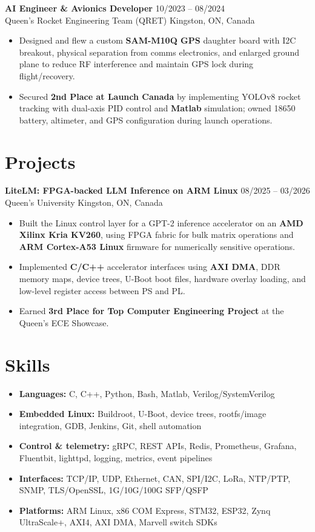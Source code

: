 \documentclass[letterpaper,10pt]{article}
\begin{document}
    \noindent \textbf{AI Engineer \& Avionics Developer} \hfill 10/2023 -- 08/2024 \\
    Queen's Rocket Engineering Team (QRET) \hfill Kingston, ON, Canada
    \begin{itemize}
        \item Designed and flew a custom \textbf{SAM-M10Q GPS} daughter board with I2C breakout, physical separation from comms electronics, and enlarged ground plane to reduce RF interference and maintain GPS lock during flight/recovery.
        \item Secured \textbf{2nd Place at Launch Canada} by implementing YOLOv8 rocket tracking with dual-axis PID control and \textbf{Matlab} simulation; owned 18650 battery, altimeter, and GPS configuration during launch operations.
    \end{itemize}

    \section{Projects}
    \noindent \textbf{LiteLM: FPGA-backed LLM Inference on ARM Linux} \hfill 08/2025 -- 03/2026 \\
    Queen's University \hfill Kingston, ON, Canada
    \begin{itemize}
        \item Built the Linux control layer for a GPT-2 inference accelerator on an \textbf{AMD Xilinx Kria KV260}, using FPGA fabric for bulk matrix operations and \textbf{ARM Cortex-A53 Linux} firmware for numerically sensitive operations.
        \item Implemented \textbf{C/C++} accelerator interfaces using \textbf{AXI DMA}, DDR memory maps, device trees, U-Boot boot files, hardware overlay loading, and low-level register access between PS and PL.
        \item Earned \textbf{3rd Place for Top Computer Engineering Project} at the Queen's ECE Showcase.
    \end{itemize}

    \section{Skills}
    \begin{itemize}[label={}, leftmargin=0pt, noitemsep]
        \item \textbf{Languages:} C, C++, Python, Bash, Matlab, Verilog/SystemVerilog
        \item \textbf{Embedded Linux:} Buildroot, U-Boot, device trees, rootfs/image integration, GDB, Jenkins, Git, shell automation
        \item \textbf{Control \& telemetry:} gRPC, REST APIs, Redis, Prometheus, Grafana, Fluentbit, lighttpd, logging, metrics, event pipelines
        \item \textbf{Interfaces:} TCP/IP, UDP, Ethernet, CAN, SPI/I2C, LoRa, NTP/PTP, SNMP, TLS/OpenSSL, 1G/10G/100G SFP/QSFP
        \item \textbf{Platforms:} ARM Linux, x86 COM Express, STM32, ESP32, Zynq UltraScale+, AXI4, AXI DMA, Marvell switch SDKs
    \end{itemize}
\end{document}
